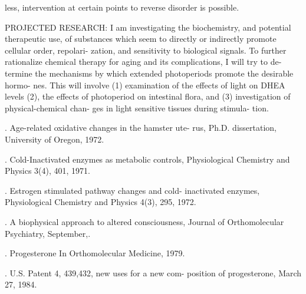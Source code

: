 \documentclass[10pt]{memoir}
\begin{document}
\begin{multicols}{2}
	\columnbreak

	\noindent less, intervention at certain points to reverse\linebreak
	disorder is possible.

	\bigskip

	\noindent PROJECTED RESEARCH: I am investigating\linebreak
	the biochemistry, and potential therapeutic\linebreak
	use, of substances which seem to directly\linebreak
	or indirectly promote cellular order, repolari-\linebreak
	zation, and sensitivity to biological signals.\linebreak
	To further rationalize chemical therapy for\linebreak
	aging and its complications, I will try to de-\linebreak
	termine the mechanisms by which extended\linebreak
	photoperiods promote the desirable hormo-\linebreak
	nes. This will involve (1) examination of\linebreak
	the effects of light on DHEA levels (2), the\linebreak
	effects of photoperiod on intestinal flora, and\linebreak
	(3) investigation of physical-chemical chan-\linebreak
	ges in light sensitive tissues during stimula-\linebreak
	tion.

	\bigskip


	\smallskip

	{%
		\small%
		. Age-related oxidative changes in the hamster ute-\linebreak
		rus, Ph.D. dissertation, University of Oregon, 1972.

		. Cold-Inactivated enzymes as metabolic controls,\linebreak
		Physiological Chemistry and Physics 3(4), 401, 1971.

		. Estrogen stimulated pathway changes and cold-\linebreak
		inactivated enzymes, Physiological Chemistry and\linebreak
		Physics 4(3), 295, 1972.

		. A biophysical approach to altered consciousness,\linebreak
		Journal of Orthomolecular Psychiatry, September,.

		. Progesterone In Orthomolecular Medicine, 1979.

		. U.S. Patent 4, 439,432, new uses for a new com-\linebreak
		position of progesterone, March 27, 1984.%
	}

\end{multicols}
\end{document}
